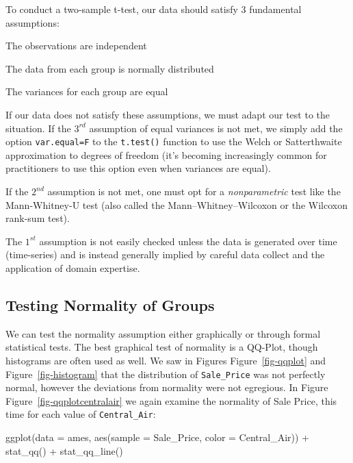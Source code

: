 \documentclass[
  letterpaper,
  DIV=11,
  numbers=noendperiod]{scrreprt}
\newenvironment{Shaded}{\begin{snugshade}}{\end{snugshade}}
\newcommand{\AttributeTok}[1]{\textcolor[rgb]{0.40,0.45,0.13}{#1}}
\newcommand{\FunctionTok}[1]{\textcolor[rgb]{0.28,0.35,0.67}{#1}}
\newcommand{\NormalTok}[1]{\textcolor[rgb]{0.00,0.23,0.31}{#1}}
\newcommand{\SpecialCharTok}[1]{\textcolor[rgb]{0.37,0.37,0.37}{#1}}
\begin{document}
To conduct a two-sample t-test, our data should satisfy 3 fundamental
assumptions:

The observations are independent

The data from each group is normally distributed

The variances for each group are equal

If our data does not satisfy these assumptions, we must adapt our test
to the situation. If the \(3^{rd}\) assumption of equal variances is not
met, we simply add the option \texttt{var.equal=F} to the
\texttt{t.test()} function to use the Welch or Satterthwaite
approximation to degrees of freedom (it's becoming increasingly common
for practitioners to use this option even when variances are equal).

If the \(2^{nd}\) assumption is not met, one must opt for a
\emph{nonparametric} test like the Mann-Whitney-U test (also called the
Mann--Whitney--Wilcoxon or the Wilcoxon rank-sum test).

The \(1^{st}\) assumption is not easily checked unless the data is
generated over time (time-series) and is instead generally implied by
careful data collect and the application of domain expertise.

\hypertarget{sec-testnorm}{%
\subsection{Testing Normality of Groups}\label{sec-testnorm}}

We can test the normality assumption either graphically or through
formal statistical tests. The best graphical test of normality is a
QQ-Plot, though histograms are often used as well. We saw in Figures
Figure~\ref{fig-qqplot} and Figure~\ref{fig-histogram} that the
distribution of \texttt{Sale\_Price} was not perfectly normal, however
the deviations from normality were not egregious. In Figure
Figure~\ref{fig-qqplotcentralair} we again examine the normality of Sale
Price, this time for each value of \texttt{Central\_Air}:

\begin{Shaded}
\begin{Highlighting}[]
\FunctionTok{ggplot}\NormalTok{(}\AttributeTok{data =}\NormalTok{ ames, }\FunctionTok{aes}\NormalTok{(}\AttributeTok{sample =}\NormalTok{ Sale\_Price, }\AttributeTok{color =}\NormalTok{ Central\_Air)) }\SpecialCharTok{+}
     \FunctionTok{stat\_qq}\NormalTok{() }\SpecialCharTok{+}
     \FunctionTok{stat\_qq\_line}\NormalTok{()}
\end{Highlighting}
\end{Shaded}
\end{document}
